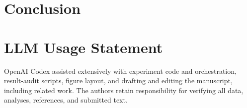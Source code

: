 \documentclass[10pt,twocolumn,letterpaper]{article}
\begin{document}
\section{Conclusion}

\section*{LLM Usage Statement}
OpenAI Codex assisted extensively with experiment code and orchestration,
result-audit scripts, figure layout, and drafting and editing the manuscript,
including related work. The authors retain responsibility for verifying all
data, analyses, references, and submitted text.

{\small}
\end{document}
